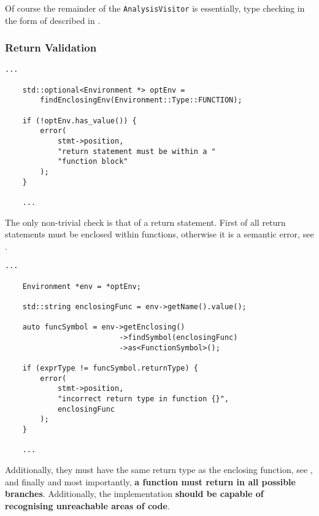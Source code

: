 Of course the remainder of the \texttt{AnalysisVisitor}
is essentially, type checking in the form of described
in .

\subsubsection{Return Validation}

\begin{lstlisting}[caption={Checking whether return statement is
inside a function declaration in the \texttt{visit(ReturnStmt
*)} method in the \texttt{AnalysisVisitor} class
(analysis/AnalysisVisitor.cpp)},label=lst:returninsidefunc]
    ...

    std::optional<Environment *> optEnv =
        findEnclosingEnv(Environment::Type::FUNCTION);

    if (!optEnv.has_value()) {
        error(
            stmt->position,
            "return statement must be within a "
            "function block"
        );
    }

    ...
\end{lstlisting}

The only non-trivial check is that of a return statement. First
of all return statements must be enclosed within functions,
otherwise it is a semantic error, see
.

\begin{lstlisting}[caption={Checking whether the return
expression has the same type as the function return type in the
\texttt{visit(ReturnStmt *)} method in the
\texttt{AnalysisVisitor} class
(analysis/AnalysisVisitor.cpp)},label=lst:returntype]
    ...

    Environment *env = *optEnv;

    std::string enclosingFunc = env->getName().value();

    auto funcSymbol = env->getEnclosing()
                          ->findSymbol(enclosingFunc)
                          ->as<FunctionSymbol>();

    if (exprType != funcSymbol.returnType) {
        error(
            stmt->position,
            "incorrect return type in function {}",
            enclosingFunc
        );
    }

    ...
\end{lstlisting}

Additionally, they must have the same return type as the
enclosing function, see , and finally and
most importantly, \textbf{a function must return in all possible
branches}. Additionally, the implementation \textbf{should be
capable of recognising unreachable areas of code}.

